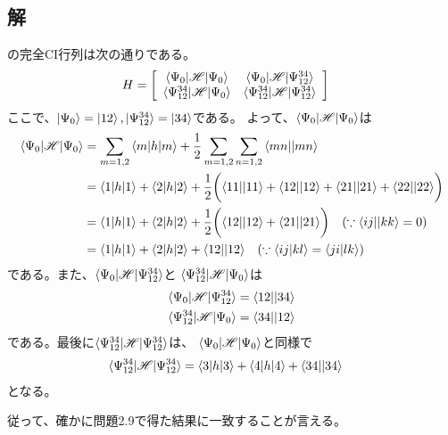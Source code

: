 \subsection{解}
の完全CI行列は次の通りである。
\begin{align}
	H
&=
	\left[
	\begin{array}{cc}
		\braket{\Psi_0|{\mathscr{H}}|\Psi_0} &
		\braket{\Psi_0|{\mathscr{H}}|\Psi_{12}^{34}} \\
		\braket{\Psi_{12}^{34}|{\mathscr{H}}|\Psi_0} &
		\braket{\Psi_{12}^{34}|{\mathscr{H}}|\Psi_{12}^{34}}
	\end{array}
	\right]
\end{align}
ここで、$\ket{\Psi_0}=\ket{12}, \ket{\Psi_{12}^{34}}=\ket{34}$である。
よって、$\braket{\Psi_0|{\mathscr{H}}|\Psi_0}$は
\begin{align}
	\braket{\Psi_0|\H|\Psi_0}
&=
	\sum_{m=1,2} \braket{m|h|m}
	+
	\frac{1}{2}
	\sum_{m=1,2} \sum_{n=1,2} \antitwo{mn}{mn} \\
%
%
&=
	\braket{1|h|1}
	+
	\braket{2|h|2}
	+
	\frac{1}{2}
	\biggl(
		\antitwo{11}{11}
		+
		\antitwo{12}{12}
		+
		\antitwo{21}{21}
		+
		\antitwo{22}{22}
	\biggr) \\
%
%
&=
	\braket{1|h|1}
	+
	\braket{2|h|2}
	+
	\frac{1}{2}
	\biggl(
		\antitwo{12}{12}
		+
		\antitwo{21}{21}
	\biggr)
	\quad
	(\because \antitwo{ij}{kk}=0) \\
%
%
&=
	\braket{1|h|1}
	+
	\braket{2|h|2}
	+
	\antitwo{12}{12}
	\quad
	(\because \phystwo{ij}{kl}=\phystwo{ji}{lk})
\end{align}
である。また、$\braket{\Psi_0|{\mathscr{H}}|\Psi_{12}^{34}}$と
$\braket{\Psi_{12}^{34}|{\mathscr{H}}|\Psi_0}$は
\begin{align}
	\braket{\Psi_0|\H|\Psi_{12}^{34}}
&=
	\antitwo{12}{34} \\
%
%
	\braket{\Psi_{12}^{34}|\H|\Psi_0}
&=
	\antitwo{34}{12}
\end{align}
である。最後に$\braket{\Psi_{12}^{34}|{\mathscr{H}}|\Psi_{12}^{34}}$は、
$\braket{\Psi_0|{\mathscr{H}}|\Psi_0}$と同様で
\begin{align}
	\braket{\Psi_{12}^{34}|{\mathscr{H}}|\Psi_{12}^{34}}
&=
	\braket{3|h|3}
	+
	\braket{4|h|4}
	+
	{\braket{34||34}}
\end{align}
となる。

従って、確かに問題2.9で得た結果に一致することが言える。
